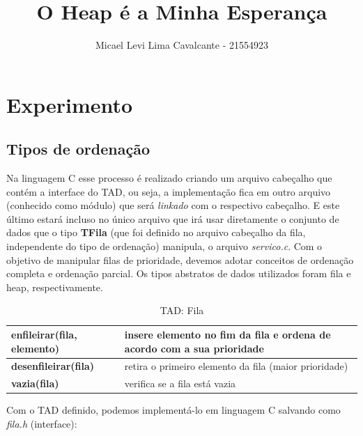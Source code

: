 \documentclass[12pt]{article}
\title{O Heap é a Minha Esperança}
\author{Micael Levi Lima Cavalcante - 21554923}
\newcommand{\code}[1]{\emph{#1}}
\begin{document}
 

\maketitle

\section{Experimento}

\subsection{Tipos de ordenação}


Na linguagem C esse processo é realizado criando um arquivo cabeçalho que contém a interface do TAD, ou seja, a implementação fica em outro arquivo (conhecido como módulo) que será \emph{linkado} com o respectivo cabeçalho. E este último estará incluso no único arquivo que irá usar diretamente o conjunto de dados que o tipo \textbf{TFila} (que foi definido no arquivo cabeçalho da fila, independente do tipo de ordenação) manipula, o arquivo \code{servico.c}.
Com o objetivo de manipular filas de prioridade, devemos adotar conceitos de ordenação completa e ordenação parcial. Os tipos abstratos de dados utilizados foram fila e heap, respectivamente.

\begin{table}[h]
\centering
\caption{TAD: Fila}
\label{table:t0}
\begin{tabular}{|ll|}
\hline
\textbf{enfileirar(fila, elemento)} & insere elemento no fim da fila e ordena de acordo com a sua prioridade \\ \hline
\textbf{desenfileirar(fila)}        & retira o primeiro elemento da fila (maior prioridade)                  \\ \hline
\textbf{vazia(fila)}                & verifica se a fila está vazia                                          \\ \hline
\end{tabular}
\end{table}

Com o TAD definido, podemos implementá-lo em linguagem C salvando como \code{fila.h} (interface):
\end{document}
